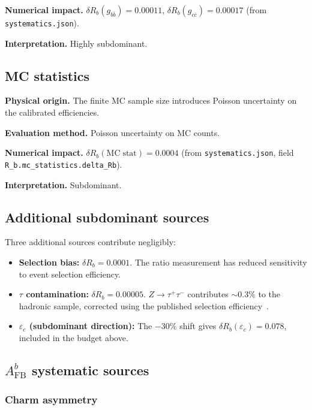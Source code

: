 \documentclass[11pt,a4paper]{article}
\begin{document}
\textbf{Numerical impact.}
$\delta R_b(g_{b\bar{b}}) = 0.00011$,
$\delta R_b(g_{c\bar{c}}) = 0.00017$
(from \texttt{systematics.json}).

\textbf{Interpretation.} Highly subdominant.

\subsection{MC statistics}
\label{sec:syst_mc_stat}

\textbf{Physical origin.} The finite MC sample size introduces Poisson uncertainty on
the calibrated efficiencies.

\textbf{Evaluation method.} Poisson uncertainty on MC counts.

\textbf{Numerical impact.}
$\delta R_b(\mathrm{MC\;stat}) = 0.0004$
(from \texttt{systematics.json}, field \texttt{R\_b.mc\_statistics.delta\_Rb}).

\textbf{Interpretation.} Subdominant.

\subsection{Additional subdominant sources}
\label{sec:syst_minor}

Three additional sources contribute negligibly:
\begin{itemize}
\item \textbf{Selection bias:}
$\delta R_b = 0.0001$. The ratio measurement has reduced sensitivity
to event selection efficiency.
\item \textbf{$\tau$ contamination:}
$\delta R_b = 0.00005$. $Z \to \tau^+\tau^-$ contributes $\sim 0.3\%$ to the
hadronic sample, corrected using the published selection efficiency~\cite{ALEPH:sigma_had}.
\item \textbf{$\varepsilon_c$ (subdominant direction):} The $-30\%$ shift gives
$\delta R_b(\varepsilon_c) = 0.078$, included in the budget above.
\end{itemize}

\subsection{$A_\mathrm{FB}^b$ systematic sources}
\label{sec:syst_afb}

\subsubsection{Charm asymmetry}
\label{sec:syst_charm_asym}
\end{document}
